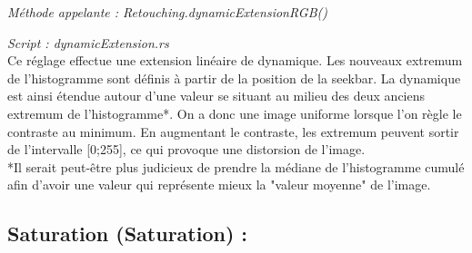 \emph{Méthode appelante : Retouching.dynamicExtensionRGB()}

\emph{Script : dynamicExtension.rs}
\\ 

Ce réglage effectue une extension linéaire de dynamique. Les nouveaux extremum de l'histogramme sont définis à partir de la position de la seekbar.
La dynamique est ainsi étendue autour d'une valeur se situant au milieu des deux anciens extremum de l'histogramme*. On a donc une image uniforme lorsque
l'on règle le contraste au minimum. En augmentant le contraste, les extremum peuvent sortir de l'intervalle [0;255], ce qui provoque une distorsion de l'image.
\\

*Il serait peut-être plus judicieux de prendre la médiane de l'histogramme cumulé afin d'avoir une valeur qui représente mieux la "valeur moyenne" de l'image.


\subsection{Saturation (Saturation) :}

